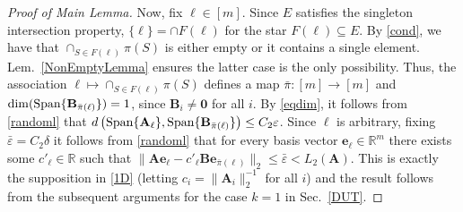 \documentclass[9pt,twocolumn]{pnas-new}
\newtheorem{lemma}{Lemma}
\begin{document}
\begin{proof}[Proof of Main Lemma]
Now, fix $\ell \in [m]$. Since $E$ satisfies the singleton intersection property, $\{\ell\} = \cap F(\ell)$ for the star $F(\ell) \subseteq E$. By \eqref{cond}, we have that $\cap_{S \in F(\ell)} \pi(S)$ is either empty or it contains a single element. Lem.~\ref{NonEmptyLemma} ensures the latter case is the only possibility. Thus, the association $\ell \mapsto \cap_{S \in F(\ell)} \pi(S)$ defines a map $\bar \pi: [m] \to [m]$ and $\dim(\text{\rm Span}\{\mathbf{B}_{\bar \pi(\ell)}\}) = 1$, since $\mathbf{B}_i \neq \textbf{0}$ for all $i$. By \eqref{eqdim}, it follows from \eqref{randoml} that $d\left( \text{\rm Span}\{\mathbf{A}_\ell\}, \text{\rm Span}\{ \mathbf{B}_{\bar \pi(\ell)} \} \right) \leq C_2 \varepsilon$. Since $\ell$ is arbitrary, fixing $\bar \varepsilon = C_2\delta$ it follows from \eqref{randoml} that for every basis vector $\mathbf{e}_\ell \in \mathbb{R}^m$ there exists some $c'_\ell \in \mathbb{R}$ such that $\|\mathbf{A}\mathbf{e}_\ell - c'_\ell \mathbf{B}\mathbf{e}_{\bar \pi(\ell)}\|_2 \leq \bar \varepsilon < L_2(\mathbf{A})$. This is exactly the supposition in \eqref{1D} (letting $c_i = \|\mathbf{A}_i\|_2^{-1}$ for all $i$) and the result follows from the subsequent arguments for the case $k=1$ in Sec.~\ref{DUT}.
\end{proof}


%
%
\end{document}

